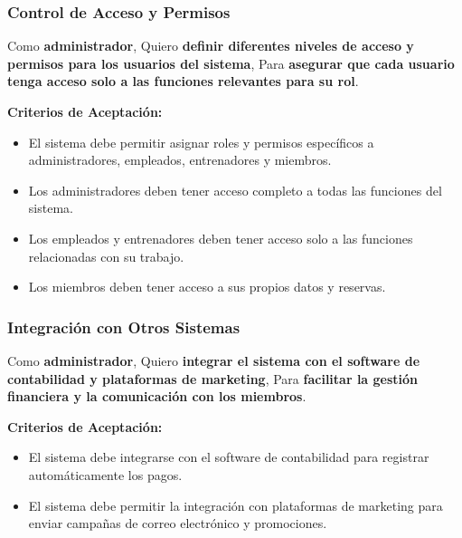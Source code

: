 \documentclass[spanish, 12pt]{article}
\providecommand{\tightlist}{\setlength{\itemsep}{0pt}
\setlength{\parskip}{0pt}}
\begin{document}
	\subsubsection{Control de Acceso y Permisos}
	\label{control-de-acceso-y-permisos}

	Como \textbf{administrador}, Quiero \textbf{definir diferentes niveles de
	acceso y permisos para los usuarios del sistema}, Para \textbf{asegurar que
	cada usuario tenga acceso solo a las funciones relevantes para su rol}.

	\textbf{Criterios de Aceptación:}

	\begin{itemize}
		\tightlist

		\item El sistema debe permitir asignar roles y permisos específicos a administradores,
			empleados, entrenadores y miembros.

		\item Los administradores deben tener acceso completo a todas las funciones del
			sistema.

		\item Los empleados y entrenadores deben tener acceso solo a las funciones relacionadas
			con su trabajo.

		\item Los miembros deben tener acceso a sus propios datos y reservas.
	\end{itemize}

	\subsubsection{Integración con Otros Sistemas}
	\label{integraciuxf3n-con-otros-sistemas}

	Como \textbf{administrador}, Quiero \textbf{integrar el sistema con el
	software de contabilidad y plataformas de marketing}, Para \textbf{facilitar
	la gestión financiera y la comunicación con los miembros}.

	\textbf{Criterios de Aceptación:}

	\begin{itemize}
		\tightlist

		\item El sistema debe integrarse con el software de contabilidad para registrar
			automáticamente los pagos.

		\item El sistema debe permitir la integración con plataformas de marketing para
			enviar campañas de correo electrónico y promociones.
	\end{itemize}
\end{document}
